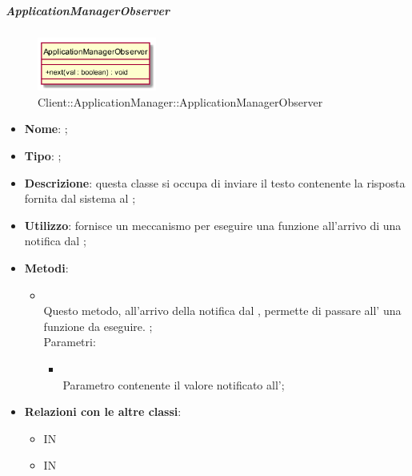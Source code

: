 \hypertarget{ApplicationManagerObserver_label}{\subparagraph{ApplicationManagerObserver}}
\begin{figure}[h]
	\centering
	\includegraphics[width=0.35\textwidth,height=\textheight,keepaspectratio]{images/ClassApplicationManagerObserver.png}
	\caption{Client::ApplicationManager::ApplicationManagerObserver}
\end{figure}
\begin{itemize}
	\item \textbf{Nome}: ;
	\item \textbf{Tipo}: ;
	\item \textbf{Descrizione}: questa classe si occupa di inviare il testo contenente la risposta fornita dal sistema al ;
	\item \textbf{Utilizzo}: fornisce un meccanismo per eseguire una funzione all'arrivo di una notifica dal ;
	\item \textbf{Metodi}:
	\begin{itemize}
		\item[]  \\		Questo metodo, all'arrivo della notifica dal , permette di passare all' una funzione da eseguire.
		;\\
		Parametri:
		\begin{itemize}
			\item {} \\
			Parametro contenente il valore notificato all';
		\end{itemize}
	\end{itemize}
	\item \textbf{Relazioni con le altre classi}:
	\begin{itemize}
		\item IN \hyperlink{Manager_label}{}
		\item IN \hyperlink{DataArrivedObservable_label}{}
	\end{itemize}
\end{itemize}
\FloatBarrier

